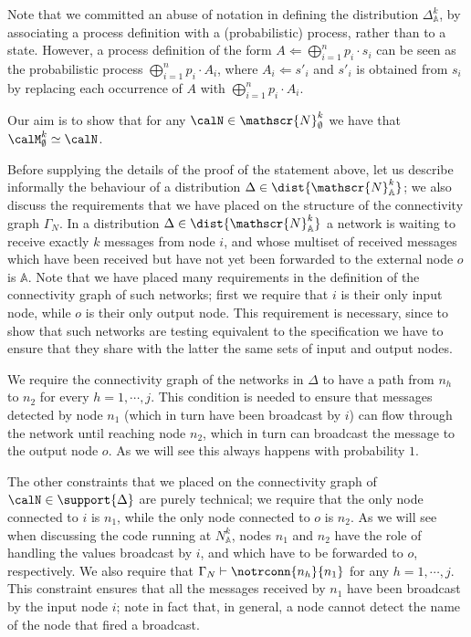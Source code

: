 \documentclass{LMCS}
\begin{document}
\begin{remark}
Note that we committed an abuse of notation in defining the 
distribution $\Delta^k_{\mathbb{A}}$, by associating a 
process definition with a (probabilistic) process, rather than to 
a state. However, a process definition of the form $A \Leftarrow 
\bigoplus_{i=1}^n p_i \cdot s_i$ can be seen as the probabilistic 
process $\bigoplus_{i=1}^n p_i \cdot A_i$, where 
$A_i \Leftarrow s'_i$ and $s'_i$ is obtained from $s_i$ by replacing 
each occurrence of $A$ with $\bigoplus_{i=1}^n p_i \cdot A_i$.
\end{remark}
\noindent
Our aim is to show that for any $\calN \in \mathscr{N}^k_{\emptyset}$ 
we have that $\calM^k_{\emptyset} \simeq \calN$. 

Before supplying the details of the proof of the statement above, 
let us describe informally the behaviour of a distribution 
$\Delta \in \dist{\mathscr{N}^k_{\mathbb{A}}}$; we also discuss the 
requirements that we have placed on the structure of the 
connectivity graph $\Gamma_N$. 
In a distribution $\Delta \in \dist{\mathscr{N}^k_{\mathbb{A}}}$ 
a network is waiting to receive exactly $k$ messages from node $i$, 
and whose multiset of received messages which have been 
received but have not yet been forwarded to the external node $o$ 
is $\mathbb{A}$.
Note that we have placed many requirements in the definition of 
the connectivity graph of such networks; first we require that 
$i$ is their only input node, while $o$ is their only output node. 
This requirement is necessary, since to show that such 
networks are testing equivalent to the specification we 
have to ensure that they share with the latter the same sets 
of input and output nodes.

We require the connectivity graph of the networks in $\Delta$ to have 
a path from $n_h$ to $n_2$ for every $h=1,\cdots,j$. 
This condition is needed to ensure that messages detected by 
node $n_1$ (which in turn have been broadcast by $i$) can flow 
through the network until reaching node $n_2$, which in turn 
can broadcast the message to the output node $o$. 
As we will see this always happens with probability $1$.

The other constraints that we placed on the connectivity graph 
of $\calN \in \support{\Delta}$ are purely technical; we require that 
the only node connected to $i$ is $n_1$, while the only node 
connected to $o$ is $n_2$. As we will see when discussing the 
code running at $N^k_{\mathbb{A}}$, nodes $n_1$ and $n_2$ 
have the role of handling the values broadcast by $i$, and 
which have to be forwarded to $o$, respectively. 
We also require that $\Gamma_N \vdash \notrconn{n_h}{n_1}$ 
for any $h=1,\cdots,j$. This constraint ensures that all 
the messages received by $n_1$ have been broadcast by the 
input node $i$; note in fact that, in general, a node 
cannot detect the name of the node that fired 
a broadcast.
\end{document}
